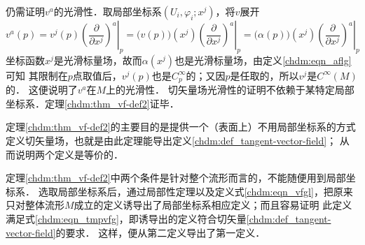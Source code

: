 仍需证明$v^a$的光滑性．取局部坐标系$(U_i,\varphi_i;x^j)$，将$v$展开
\setlength{\mathindent}{0em}
\begin{equation}\label{chdm:eqn_tmpadf23}
    v^a(p) = v^j(p) \left.\left(\frac{\partial }{\partial x^j}\right)^a \right|_p
      = \bigl(v(p)\bigr)(x^j) \left.\left(\frac{\partial }{\partial x^j}\right)^a \right|_p
      = \bigl(\alpha(p)\bigr)(x^j) \left.\left(\frac{\partial }{\partial x^j}\right)^a \right|_p
\end{equation}\setlength{\mathindent}{2em}
坐标函数$x^j$是光滑标量场，故而$\alpha(x^j)$也是光滑标量场，由定义\eqref{chdm:eqn_aflg}可知
其限制在$p$点取值后，$v^j(p)$也是$C^\infty_p$的；又因$p$是任取的，所以$v^j$是$C^\infty(M)$的．
这便说明了$v^a$在$M$上的光滑性．
切矢量场光滑性的证明不依赖于某特定局部坐标系．定理\ref{chdm:thm_vf-def2}证毕．

\begin{remark}
    定理\ref{chdm:thm_vf-def2}的主要目的是提供一个（表面上）不用局部坐标系的方式
    定义切矢量场，也就是由此定理能导出定义\ref{chdm:def_tangent-vector-field}；
    从而说明两个定义是等价的．

    定理\ref{chdm:thm_vf-def2}中两个条件是针对整个流形而言的，不能随便用到局部坐标系．
    选取局部坐标系后，通过局部性定理以及定义式\eqref{chdm:eqn_vfgl}，把原来
    只对整体流形$M$成立的定义诱导出了局部坐标系相应定义；而且容易证明
    此定义满足式\eqref{chdm:eqn_tmpvfg}，即诱导出的定义符合切矢量\ref{chdm:def_tangent-vector-field}的要求．
    这样，便从第二定义导出了第一定义．
\end{remark}



